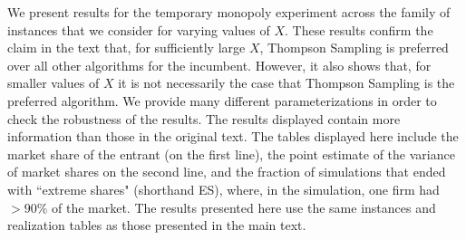 \documentclass[11pt,letterpaper]{article}
\begin{document}
We present results for the temporary monopoly experiment across the family of instances that we consider for varying values of $X$. These results confirm the claim in the text that, for sufficiently large $X$, Thompson Sampling is preferred over all other algorithms for the incumbent. However, it also shows that, for smaller values of $X$ it is not necessarily the case that Thompson Sampling is the preferred algorithm. We provide many different parameterizations in order to check the robustness of the results. The results displayed contain more information than those in the original text. The tables displayed here include the market share of the entrant (on the first line), the point estimate of the variance of market shares on the second line, and the fraction of simulations that ended with ``extreme shares" (shorthand ES), where, in the simulation, one firm had $> 90\%$ of the market. The results presented here use the same instances and realization tables as those presented in the main text. 
\end{document}
